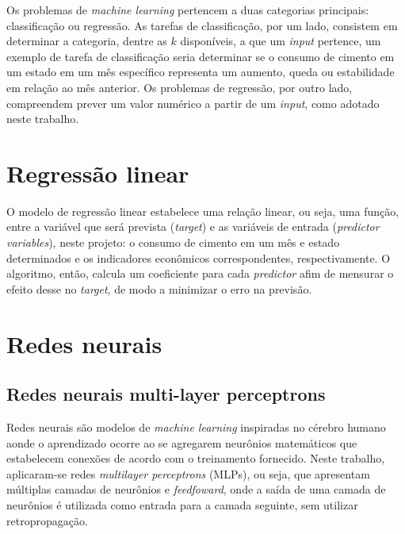   Os problemas de \textit{machine learning} pertencem a duas categorias principais: classificação ou regressão. As tarefas de classificação, por um lado, consistem em determinar a categoria, dentre as $k$ disponíveis, a que um \textit{input} pertence, um exemplo de tarefa de classificação seria determinar se o consumo de cimento em um estado em um mês específico representa um aumento, queda ou estabilidade em relação ao mês anterior. Os problemas de regressão, por outro lado, compreendem prever um valor numérico a partir de um \textit{input}, \cite{Goodfellow-et-al-2016} como adotado neste trabalho.

  
\section*{Regressão linear}
O modelo de regressão linear estabelece uma relação linear, ou seja, uma função, entre a variável que será prevista (\textit{target}) e as variáveis de entrada (\textit{predictor variables}), neste projeto: o consumo de cimento em um mês e estado determinados e os indicadores econômicos correspondentes, respectivamente. O algoritmo, então, calcula um coeficiente para cada \textit{predictor} afim de mensurar o efeito desse no \textit{target}, de modo a minimizar o erro na previsão.
     
\section*{Redes neurais}

\subsection*{Redes neurais multi-layer perceptrons}
Redes neurais são modelos de \textit{machine learning} inspiradas no cérebro humano aonde o aprendizado ocorre ao se agregarem neurônios matemáticos que estabelecem conexões de acordo com o treinamento fornecido. Neste trabalho, aplicaram-se redes \textit{multilayer perceptrons} (MLPs), ou seja, que apresentam múltiplas camadas de neurônios e \textit{feedfoward}, onde a saída de uma camada de neurônios é utilizada como entrada para a camada seguinte, sem utilizar retropropagação.
          
